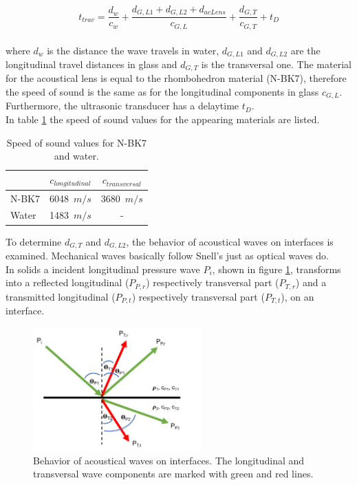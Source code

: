 \begin{equation}
t_{trav} = \frac{d_w}{c_w} + \frac{d_{G,L1}+d_{G,L2}+d_{acLens}}{c_{G,L}} + \frac{d_{G,T}}{c_{G,T}} + t_D
\label{eq:travTime}
\end{equation}
\\
where $d_w$ is the distance the wave travels in water, $d_{G,L1}$ and $d_{G,L2}$ are the longitudinal travel distances in glass and $d_{G,T}$ is the transversal one. The material for the acoustical lens is equal to the rhombohedron material (N-BK7), therefore the speed of sound is the same as for the longitudinal components in glass $c_{G,L}$. Furthermore, the ultrasonic transducer has a delaytime $t_D$. \\
In table \ref{tab:matSpecs} the speed of sound values for the appearing materials are listed.

\begin{table}[H]
	\centering
	\caption{Speed of sound values for N-BK7 and water.}
	\begin{tabular}{| m{2.2cm} | c | c |}
		\hline
		&$c_{longitudinal}$&$c_{transversal}$\\ \hline
		\centering N-BK7 \cite{data:BK7}&6048~$m/s$ &3680~$m/s$\\ \hline
		\centering Water \cite{Haynes:physicalProperties} &1483~$m/s$& - \\ \hline
	\end{tabular}
	\label{tab:matSpecs}
\end{table}

To determine $d_{G,T}$ and $d_{G,L2}$, the behavior of acoustical waves on interfaces is examined. Mechanical waves basically follow Snell's just as optical waves do. \\
In solids a incident longitudinal pressure wave $P_i$, shown in figure \ref{fig:acousticInterface}, transforms into a reflected longitudinal ($P_{P,r}$) respectively transversal part ($P_{T,r}$) and a transmitted longitudinal ($P_{P,t}$) respectively transversal part ($P_{T,t}$), on an interface.

\begin{figure}[H]
	\centering
	\includegraphics[height = 0.33\textheight, width = 0.58\textwidth]{02_principles_of_photoacoustics/images/acousticInterface.png}
	\caption{Behavior of acoustical waves on interfaces. The longitudinal and transversal wave components are marked with green and red lines.}
	\label{fig:acousticInterface}
\end{figure}

